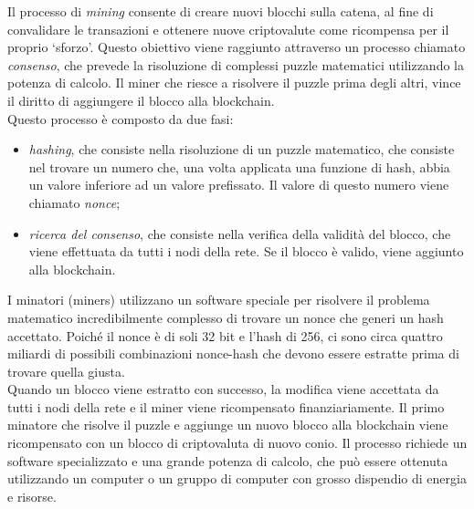 Il processo di \textit{mining} consente di creare nuovi blocchi sulla catena, al fine di convalidare le transazioni e ottenere nuove criptovalute come ricompensa per il proprio `sforzo'.
Questo obiettivo viene raggiunto attraverso un processo chiamato \textit{consenso}, che prevede la risoluzione di complessi puzzle matematici utilizzando la potenza di calcolo.
Il miner che riesce a risolvere il puzzle prima degli altri, vince il diritto di aggiungere il blocco alla blockchain. \\

Questo processo è composto da due fasi:
\begin{itemize}
    \item \textit{hashing}, che consiste nella risoluzione di un puzzle matematico, che consiste nel trovare un numero che, una volta applicata una funzione di hash, abbia un valore inferiore ad un valore prefissato. Il valore di questo numero viene chiamato \textit{nonce};
    \item \textit{ricerca del consenso}, che consiste nella verifica della validità del blocco, che viene effettuata da tutti i nodi della rete. Se il blocco è valido, viene aggiunto alla blockchain.
\end{itemize}

I minatori (miners) utilizzano un software speciale per risolvere il problema matematico incredibilmente complesso 
di trovare un nonce che generi un hash accettato. Poiché il nonce è di soli 32 bit e l'hash di 256, ci sono circa quattro miliardi 
di possibili combinazioni nonce-hash che devono essere estratte prima di trovare quella giusta. \\

Quando un blocco viene estratto con successo, la modifica viene accettata da tutti i nodi della rete e il miner viene ricompensato finanziariamente. 
Il primo minatore che risolve il puzzle e aggiunge un nuovo blocco alla blockchain viene ricompensato con un blocco di criptovaluta di nuovo conio.
Il processo richiede un software specializzato e una grande potenza di calcolo, che può essere ottenuta utilizzando un computer o un gruppo di computer con grosso dispendio di energia e risorse.

